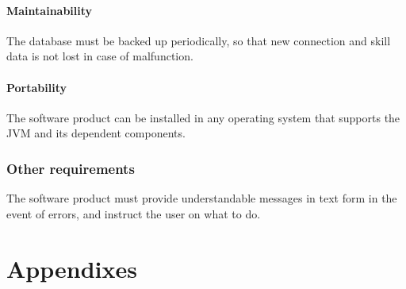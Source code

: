\documentclass[10pt,a4paper,titlepage]{article}
\begin{document}
\subsection{Maintainability}
The database must be backed up periodically, so that new connection and skill data is not lost
in case of malfunction.

\subsection{Portability}
The software product can be installed in any operating system that supports the JVM and its dependent components.

\section{Other requirements}
The software product must provide understandable messages in text form in the event of
errors, and instruct the user on what to do.

\clearpage
\part{Appendixes}

\clearpage
\tableofcontents
\end{document}
